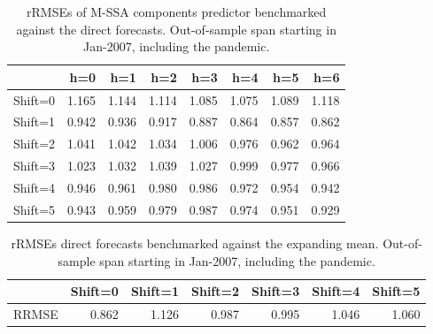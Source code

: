\documentclass[a4paper]{article}
\begin{document}
\begin{table}[ht]
\centering
\begin{tabular}{rrrrrrrr}
  \hline
 & h=0 & h=1 & h=2 & h=3 & h=4 & h=5 & h=6 \\ 
  \hline
Shift=0 & 1.165 & 1.144 & 1.114 & 1.085 & 1.075 & 1.089 & 1.118 \\ 
  Shift=1 & 0.942 & 0.936 & 0.917 & 0.887 & 0.864 & 0.857 & 0.862 \\ 
  Shift=2 & 1.041 & 1.042 & 1.034 & 1.006 & 0.976 & 0.962 & 0.964 \\ 
  Shift=3 & 1.023 & 1.032 & 1.039 & 1.027 & 0.999 & 0.977 & 0.966 \\ 
  Shift=4 & 0.946 & 0.961 & 0.980 & 0.986 & 0.972 & 0.954 & 0.942 \\ 
  Shift=5 & 0.943 & 0.959 & 0.979 & 0.987 & 0.974 & 0.951 & 0.929 \\ 
   \hline
\end{tabular}
\caption{rRMSEs of M-SSA components predictor benchmarked against the direct forecasts. Out-of-sample span starting in Jan-2007, including the pandemic.} 
\label{rRMSE_mSSA_comp_direct3}
\end{table}%
\begin{table}[ht]
\centering
\begin{tabular}{rrrrrrr}
  \hline
 & Shift=0 & Shift=1 & Shift=2 & Shift=3 & Shift=4 & Shift=5 \\ 
  \hline
RRMSE & 0.862 & 1.126 & 0.987 & 0.995 & 1.046 & 1.060 \\ 
   \hline
\end{tabular}
\caption{rRMSEs direct forecasts benchmarked against the expanding mean. Out-of-sample span starting in Jan-2007, including the pandemic.} 
\label{rRMSE_mSSA_direct_mean4}
\end{table}
\end{document}
